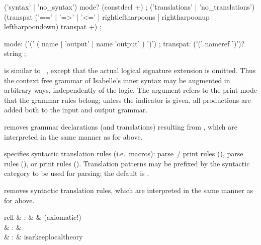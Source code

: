 \begin{isabellebody}
\begin{isamarkuptext}
  \begin{rail}
    ('syntax' | 'no\_syntax') mode? (constdecl +)
    ;
    ('translations' | 'no\_translations') (transpat ('==' | '=>' | '<=' | rightleftharpoons | rightharpoonup | leftharpoondown) transpat +)
    ;

    mode: ('(' ( name | 'output' | name 'output' ) ')')
    ;
    transpat: ('(' nameref ')')? string
    ;
  \end{rail}

  \begin{descr}
  
  \item [\mbox{\isa{\isacommand{syntax}}}~\isa{{\isacharparenleft}mode{\isacharparenright}\ decls}] is similar to
  \mbox{}~, except that the actual logical
  signature extension is omitted.  Thus the context free grammar of
  Isabelle's inner syntax may be augmented in arbitrary ways,
  independently of the logic.  The  argument refers to the
  print mode that the grammar rules belong; unless the \mbox{} indicator is given, all productions are added both to the
  input and output grammar.
  
  \item [\mbox{\isa{\isacommand{no{\isacharunderscore}syntax}}}~\isa{{\isacharparenleft}mode{\isacharparenright}\ decls}] removes
  grammar declarations (and translations) resulting from , which are interpreted in the same manner as for \mbox{} above.
  
  \item [\mbox{\isa{\isacommand{translations}}}~\isa{rules}] specifies syntactic
  translation rules (i.e.\ macros): parse~/ print rules (\isa{{\isasymrightleftharpoons}}),
  parse rules (\isa{{\isasymrightharpoonup}}), or print rules (\isa{{\isasymleftharpoondown}}).
  Translation patterns may be prefixed by the syntactic category to be
  used for parsing; the default is .
  
  \item [\mbox{\isa{\isacommand{no{\isacharunderscore}translations}}}~\isa{rules}] removes syntactic
  translation rules, which are interpreted in the same manner as for
  \mbox{} above.

  \end{descr}%
\end{isamarkuptext}%
\isamarkuptrue%
%
\isamarkuptrue%
%
\begin{isamarkuptext}%
\begin{matharray}{rcll}
    \mbox{} & : &  & (axiomatic!) \\
    \mbox{} & : &  \\
    \mbox{} & : & isarkeep{local{\dsh}theory} \\
  \end{matharray}


\end{isamarkuptext}
\end{isabellebody}
